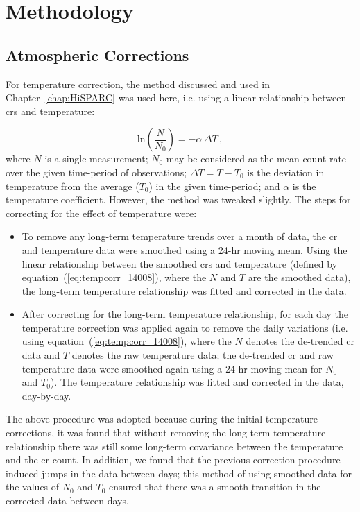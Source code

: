 \section{Methodology}\label{sec:HS_14008_methods}

\subsection{Atmospheric Corrections}

For temperature correction, the method discussed and used in Chapter~\ref{chap:HiSPARC} was used here, i.e. using a linear relationship between \glspl{cr} and temperature:

\begin{equation}
\mathrm{ln} \left( \frac{N}{N_0} \right) = - \alpha \, \Delta T \, ,
\label{eq:tempcorr_14008}
\end{equation}
%
where $N$ is a single measurement; $N_0$ may be considered as the mean count rate over the given time-period of observations; $\Delta T = T - T_0$ is the deviation in temperature from the average ($T_0$) in the given time-period; and $\alpha$ is the temperature coefficient. However, the method was tweaked slightly. The steps for correcting for the effect of temperature were:

\begin{itemize}
	\item{To remove any long-term temperature trends over a month of data, the \gls{cr} and temperature data were smoothed using a 24-hr moving mean. Using the linear relationship between the smoothed \glspl{cr} and temperature (defined by equation~(\ref{eq:tempcorr_14008}), where the $N$ and $T$ are the smoothed data), the long-term temperature relationship was fitted and corrected in the data.}

	\item{After correcting for the long-term temperature relationship, for each day the temperature correction was applied again to remove the daily variations (i.e. using equation~(\ref{eq:tempcorr_14008}), where the $N$ denotes the de-trended \gls{cr} data and $T$ denotes the raw temperature data; the de-trended \gls{cr} and raw temperature data were smoothed again using a 24-hr moving mean for $N_0$ and $T_0$). The temperature relationship was fitted and corrected in the data, day-by-day.}
\end{itemize}


The above procedure was adopted because during the initial temperature corrections, it was found that without removing the long-term temperature relationship there was still some long-term covariance between the temperature and the \gls{cr} count. In addition, we found that the previous correction procedure induced jumps in the data between days; this method of using smoothed data for the values of $N_0$ and $T_0$ ensured that there was a smooth transition in the corrected data between days.

